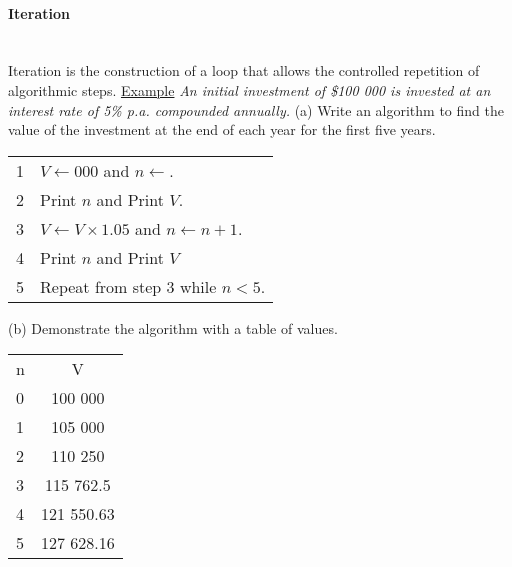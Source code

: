 \documentclass[a4paper]{article}
\begin{document}
				\paragraph{Iteration}\mbox{}\\
					Iteration is the construction of a loop that allows the controlled repetition of algorithmic steps.\newline\newline
					\newpage
					\noindent\underline{Example}\newline
					\textit{An initial investment of \$100 000 is invested at an interest rate of 5\% p.a. compounded annually.}\newline
					(a) Write an algorithm to find the value of the investment at the end of each year for the first five years.\newline
					\bgroup
					\def\arraystretch{1.5}
					\begin{table}[h]
						\centering
						\begin{tabular}{|l|l|}
							\hline
							1 & $V\gets 000$ and $n\gets$. \\
							2 & Print $n$ and Print $V$. \\
							3 & $V\gets V\times1.05$ and $n\gets n+1$. \\
							4 & Print $n$ and Print $V$ \\
							5 & Repeat from step 3 while $n<5$. \\
							\hline
						\end{tabular}
					\end{table}
					\egroup
					\newline
					(b) Demonstrate the algorithm with a table of values.\newline
					\bgroup
					\def\arraystretch{1.5}
					\begin{table}[h]
						\centering
						\begin{tabular}{|l|c|}
							\hline
							n & V \\
							0 & 100 000 \\ 
							1 & 105 000 \\
							2 & 110 250 \\
							3 & 115 762.5 \\
							4 & 121 550.63 \\
							5 & 127 628.16 \\
							\hline
						\end{tabular}
					\end{table}
					\egroup
\end{document}
